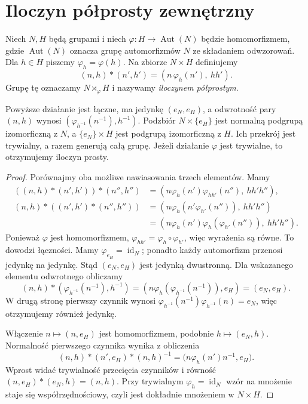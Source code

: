 \section{Iloczyn półprosty zewnętrzny}
\begin{definicja}
\label{aa:def:semidirect}
Niech $N,H$ będą grupami i niech
$\varphi:H\to\operatorname{Aut}(N)$ będzie homomorfizmem,
gdzie $\operatorname{Aut}(N)$ oznacza grupę automorfizmów $N$
ze składaniem odwzorowań. Dla $h\in H$ piszemy
$\varphi_h=\varphi(h)$.
Na zbiorze $N\times H$ definiujemy
\[
 (n,h)\ast(n',h')=(n\,\varphi_h(n'),\ hh').
\]
Grupę tę oznaczamy $N\rtimes_\varphi H$
i nazywamy \emph{iloczynem półprostym}.
\end{definicja}
\begin{twierdzenie}
\label{aa:tw:semidirect-group}
Powyższe działanie jest łączne, ma jedynkę $(e_N,e_H)$,
a odwrotność pary $(n,h)$ wynosi
$(\varphi_{h^{-1}}(n^{-1}),h^{-1})$.
Podzbiór $N\times\{e_H\}$ jest normalną podgrupą izomorficzną z $N$,
a $\{e_N\}\times H$ jest podgrupą izomorficzną z $H$.
Ich przekrój jest trywialny, a razem generują całą grupę.
Jeżeli działanie $\varphi$ jest trywialne, to otrzymujemy iloczyn prosty.
\end{twierdzenie}
\begin{proof}
Porównajmy oba możliwe nawiasowania trzech elementów.
Mamy
\begin{align*}
((n,h)\ast(n',h'))\ast(n'',h'')
 &= (n\varphi_h(n')\varphi_{hh'}(n''),\ hh'h''),\\
(n,h)\ast((n',h')\ast(n'',h''))
 &= (n\varphi_h(n'\varphi_{h'}(n'')),\ hh'h'')\\
 &= (n\varphi_h(n')\varphi_h(\varphi_{h'}(n'')),\ hh'h'').
\end{align*}
Ponieważ $\varphi$ jest homomorfizmem,
$\varphi_{hh'}=\varphi_h\circ\varphi_{h'}$,
więc wyrażenia są równe. To dowodzi łączności.
Mamy $\varphi_{e_H}=\operatorname{id}_N$;
ponadto każdy automorfizm przenosi jedynkę na jedynkę.
Stąd $(e_N,e_H)$ jest jedynką dwustronną.
Dla wskazanego elementu odwrotnego obliczamy
\[
 (n,h)\ast(\varphi_{h^{-1}}(n^{-1}),h^{-1})
 =(n\varphi_h(\varphi_{h^{-1}}(n^{-1})),e_H)=(e_N,e_H).
\]
W drugą stronę pierwszy czynnik wynosi
$\varphi_{h^{-1}}(n^{-1})\varphi_{h^{-1}}(n)=e_N$,
więc otrzymujemy również jedynkę.

Włączenie $n\mapsto(n,e_H)$ jest homomorfizmem,
podobnie $h\mapsto(e_N,h)$.
Normalność pierwszego czynnika wynika z obliczenia
\[
 (n,h)\ast(n',e_H)\ast(n,h)^{-1}
 =\bigl(n\varphi_h(n')n^{-1},e_H\bigr).
\]
Wprost widać trywialność przecięcia czynników i równość
$(n,e_H)\ast(e_N,h)=(n,h)$.
Przy trywialnym $\varphi_h=\operatorname{id}_N$
wzór na mnożenie staje się współrzędnościowy,
czyli jest dokładnie mnożeniem w $N\times H$.
\end{proof}

